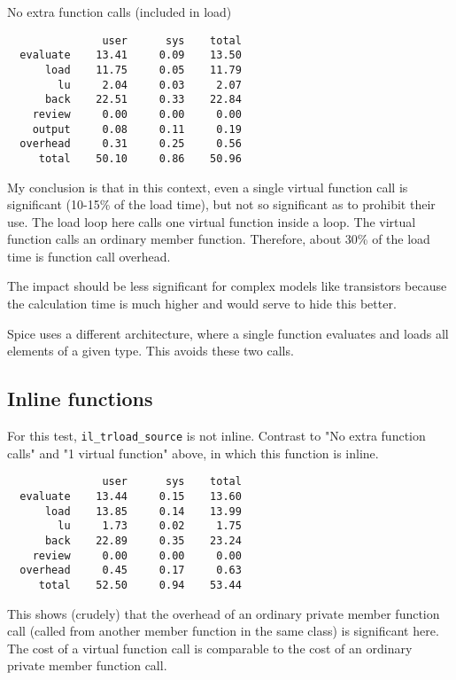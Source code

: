 No extra function calls (included in load)
\begin{verbatim}
               user      sys    total
  evaluate    13.41     0.09    13.50
      load    11.75     0.05    11.79
        lu     2.04     0.03     2.07
      back    22.51     0.33    22.84
    review     0.00     0.00     0.00
    output     0.08     0.11     0.19
  overhead     0.31     0.25     0.56
     total    50.10     0.86    50.96
\end{verbatim}

My conclusion is that in this context, even a single virtual function
call is significant (10-15\% of the load time), but not so significant
as to prohibit their use.  The load loop here calls one virtual
function inside a loop.  The virtual function calls an ordinary
member function.  Therefore, about 30\% of the load time is function
call overhead.

The impact should be less significant for complex models like
transistors because the calculation time is much higher and would
serve to hide this better.

Spice uses a different architecture, where a single function
evaluates and loads all elements of a given type.  This avoids
these two calls.
\subsection{Inline functions}

For this test, {\tt il\_trload\_source} is not inline.  Contrast
to "No extra function calls" and "1 virtual function" above, in
which this function is inline.
\begin{verbatim}
               user      sys    total
  evaluate    13.44     0.15    13.60
      load    13.85     0.14    13.99
        lu     1.73     0.02     1.75
      back    22.89     0.35    23.24
    review     0.00     0.00     0.00
  overhead     0.45     0.17     0.63
     total    52.50     0.94    53.44
\end{verbatim}

This shows (crudely) that the overhead of an ordinary private member
function call (called from another member function in the same
class) is significant here.  The cost of a virtual function call
is comparable to the cost of an ordinary private member function
call.
